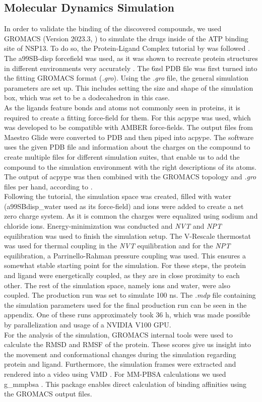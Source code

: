 \documentclass[11pt, letterpaper, titlepage]{article}
\renewcommand{\cite}{\parencite}
\begin{document}
\subsection{Molecular Dynamics Simulation}
In order to validate the binding of the discovered compounds, we used GROMACS (Version 2023.3, \textcite{packageGROMACS}) to simulate the drugs inside of the ATP binding site of NSP13. To do so, the Protein-Ligand Complex tutorial by  was followed \cite{Lemkul2018}. The a99SB-disp forcefield was used, as it was shown to recreate protein structures in different environments very accurately \cite{Forcefield}. The 6zsl PDB file was first turned into the fitting GROMACS format (\textit{.gro}). Using the \textit{.gro} file, the general simulation parameters are set up. This includes setting the size and shape of the simulation box, which was set to be a dodecahedron in this case. \\ 
As the ligands feature bonds and atoms not commonly seen in proteins, it is required to create a fitting force-field for them. For this acpype \cite{acpype} was used, which was developed to be compatible with AMBER force-fields. The output files from Maestro Glide were converted to PDB and then piped into acpype. The software uses the given PDB file and information about the charges on the compound to create multiple files for different simulation suites, that enable us to add the compound to the simulation environment with the right descriptions of its atoms.  The output of acpype was then combined with the GROMACS topology and \textit{.gro} files per hand, according to . \\
Following the tutorial, the simulation space was created, filled with water (a99SBdisp\_water used as its force-field) and ions were added to create a net zero charge system. As it is common the charges were equalized using sodium and chloride ions. Energy-minimization was conducted and \textit{NVT} and \textit{NPT} equilibration was used to finish the simulation setup. The V-Rescale thermostat was used for thermal coupling in the \textit{NVT} equilibration and for the \textit{NPT} equilibration, a Parrinello-Rahman pressure coupling was used. This ensures a somewhat stable starting point for the simulation. For these steps, the protein and ligand were energetically coupled, as they are in close proximity to each other. The rest of the simulation space, namely ions and water, were also coupled. The production run was set to simulate 100 ns. The \textit{.mdp} file containing the simulation parameters used for the final production run can be seen in the appendix. One of these runs approximately took 36 h, which was made possible by parallelization and usage of a NVIDIA V100 GPU. \\ 
For the analysis of the simulation, GROMACS internal tools were used to calculate the RMSD and RMSF of the protein. These scores give us insight into the movement and conformational changes during the simulation regarding protein and ligand. Furthermore, the simulation frames were extracted and rendered into a video using VMD \cite{VMD}. For MM-PBSA calculations we used g\_mmpbsa \cite{MMPBSA1, MMPBSA2}. This package enables direct calculation of binding affinities using the GROMACS output files.
\end{document}

